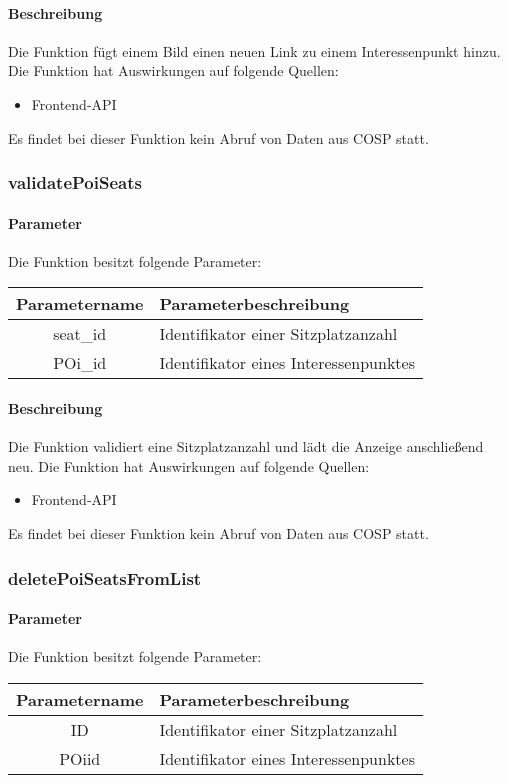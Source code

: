 \paragraph{Beschreibung} Die Funktion fügt einem Bild einen neuen Link zu einem Interessenpunkt hinzu. Die Funktion hat Auswirkungen auf folgende Quellen:
\begin{itemize}
	\item Frontend-API
\end{itemize}
Es findet bei dieser Funktion kein Abruf von Daten aus {\glqq COSP\grqq} statt.
\subsubsection{validatePoiSeats}
\paragraph{Parameter} Die Funktion besitzt folgende Parameter:
\begin{table}[H]
	\begin{tabular}{|c|p{11cm}|}
		\hline
		\textbf{Parametername} & \textbf{Parameterbeschreibung} \\ \hline
		seat\_id & Identifikator einer Sitzplatzanzahl \\ \hline
		POi\_id  & Identifikator eines Interessenpunktes \\ \hline
	\end{tabular}
\end{table}
\paragraph{Beschreibung} Die Funktion validiert eine Sitzplatzanzahl und lädt die Anzeige anschließend neu. Die Funktion hat Auswirkungen auf folgende Quellen:
\begin{itemize}
	\item Frontend-API
\end{itemize}
Es findet bei dieser Funktion kein Abruf von Daten aus {\glqq COSP\grqq} statt.
\subsubsection{deletePoiSeatsFromList}
\paragraph{Parameter} Die Funktion besitzt folgende Parameter:
\begin{table}[H]
	\begin{tabular}{|c|p{11cm}|}
		\hline
		\textbf{Parametername} & \textbf{Parameterbeschreibung} \\ \hline
		ID     & Identifikator einer Sitzplatzanzahl \\ \hline
		POiid  & Identifikator eines Interessenpunktes \\ \hline
	\end{tabular}
\end{table}
